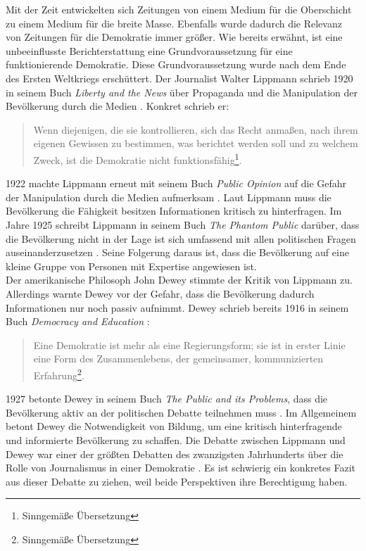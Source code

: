 Mit der Zeit entwickelten sich Zeitungen von einem Medium für die Oberschicht zu einem Medium für die breite Masse.
Ebenfalls wurde dadurch die Relevanz von Zeitungen für die Demokratie immer größer.
Wie bereits erwähnt, ist eine unbeeinflusste Berichterstattung eine Grundvoraussetzung für eine funktionierende Demokratie.
Diese Grundvoraussetzung wurde nach dem Ende des Ersten Weltkriegs erschüttert.
Der Journalist Walter Lippmann schrieb 1920 in seinem Buch \textit{Liberty and the News} über Propaganda und die Manipulation der Bevölkerung durch die Medien \cite{liberty-and-news}.
Konkret schrieb er:
\begin{quote}
    \glqq Wenn diejenigen, die sie kontrollieren, sich das Recht anmaßen, nach ihrem eigenen Gewissen zu bestimmen, was berichtet werden soll und zu welchem Zweck, ist die Demokratie nicht funktionsfähig\grqq{}\footnote{Sinngemäße Übersetzung}.
\end{quote}
1922 machte Lippmann erneut mit seinem Buch \textit{Public Opinion} auf die Gefahr der Manipulation durch die Medien aufmerksam \cite{public-opinion}.
Laut Lippmann muss die Bevölkerung die Fähigkeit besitzen Informationen kritisch zu hinterfragen.
Im Jahre 1925 schreibt Lippmann in seinem Buch \textit{The Phantom Public} darüber, dass die Bevölkerung nicht in der Lage ist sich umfassend mit allen politischen Fragen auseinanderzusetzen \cite{phantom-public}.
Seine Folgerung daraus ist, dass die Bevölkerung auf eine kleine Gruppe von Personen mit Expertise angewiesen ist. \\

Der amerikanische Philosoph John Dewey stimmte der Kritik von Lippmann zu.
Allerdings warnte Dewey vor der Gefahr, dass die Bevölkerung dadurch Informationen nur noch passiv aufnimmt.
Dewey schrieb bereits 1916 in seinem Buch \textit{Democracy and Education} \cite{democracy-and-education}:
\begin{quote}
    \glqq Eine Demokratie ist mehr als eine Regierungsform; sie ist in erster Linie eine Form des Zusammenlebens, der gemeinsamer, kommunizierten Erfahrung\grqq{}\footnote{Sinngemäße Übersetzung}.
\end{quote}
1927 betonte Dewey in seinem Buch \textit{The Public and its Problems}, dass die Bevölkerung aktiv an der politischen Debatte teilnehmen muss \cite{public-problems}.
Im Allgemeinem betont Dewey die Notwendigkeit von Bildung, um eine kritisch hinterfragende und informierte Bevölkerung zu schaffen.
Die Debatte zwischen Lippmann und Dewey war einer der größten Debatten des zwanzigsten Jahrhunderts über die Rolle von Journalismus in einer Demokratie \cite{lippmann-dewey-debate}.
Es ist schwierig ein konkretes Fazit aus dieser Debatte zu ziehen, weil beide Perspektiven ihre Berechtigung haben. \\

